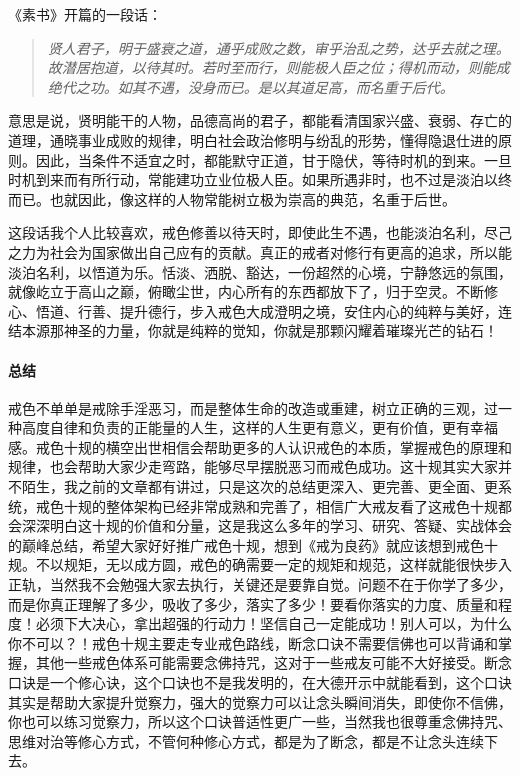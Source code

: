 《素书》开篇的一段话：

\begin{quote}\it
    贤人君子，明于盛衰之道，通乎成败之数，审乎治乱之势，达乎去就之理。故潜居抱道，以待其时。若时至而行，则能极人臣之位；得机而动，则能成绝代之功。如其不遇，没身而已。是以其道足高，而名重于后代。
\end{quote}

意思是说，贤明能干的人物，品德高尚的君子，都能看清国家兴盛、衰弱、存亡的道理，通晓事业成败的规律，明白社会政治修明与纷乱的形势，懂得隐退仕进的原则。因此，当条件不适宜之时，都能默守正道，甘于隐伏，等待时机的到来。一旦时机到来而有所行动，常能建功立业位极人臣。如果所遇非时，也不过是淡泊以终而已。也就因此，像这样的人物常能树立极为崇高的典范，名重于后世。

这段话我个人比较喜欢，戒色修善以待天时，即使此生不遇，也能淡泊名利，尽己之力为社会为国家做出自己应有的贡献。真正的戒者对修行有更高的追求，所以能淡泊名利，以悟道为乐。恬淡、洒脱、豁达，一份超然的心境，宁静悠远的氛围，就像屹立于高山之巅，俯瞰尘世，内心所有的东西都放下了，归于空灵。不断修心、悟道、行善、提升德行，步入戒色大成澄明之境，安住内心的纯粹与美好，连结本源那神圣的力量，你就是纯粹的觉知，你就是那颗闪耀着璀璨光芒的钻石！

\paragraph*{总结}

戒色不单单是戒除手淫恶习，而是整体生命的改造或重建，树立正确的三观，过一种高度自律和负责的正能量的人生，这样的人生更有意义，更有价值，更有幸福感。戒色十规的横空出世相信会帮助更多的人认识戒色的本质，掌握戒色的原理和规律，也会帮助大家少走弯路，能够尽早摆脱恶习而戒色成功。这十规其实大家并不陌生，我之前的文章都有讲过，只是这次的总结更深入、更完善、更全面、更系统，戒色十规的整体架构已经非常成熟和完善了，相信广大戒友看了这戒色十规都会深深明白这十规的价值和分量，这是我这么多年的学习、研究、答疑、实战体会的巅峰总结，希望大家好好推广戒色十规，想到《戒为良药》就应该想到戒色十规。不以规矩，无以成方圆，戒色的确需要一定的规矩和规范，这样就能很快步入正轨，当然我不会勉强大家去执行，关键还是要靠自觉。问题不在于你学了多少，而是你真正理解了多少，吸收了多少，落实了多少！要看你落实的力度、质量和程度！必须下大决心，拿出超强的行动力！坚信自己一定能成功！别人可以，为什么你不可以？！戒色十规主要走专业戒色路线，断念口诀不需要信佛也可以背诵和掌握，其他一些戒色体系可能需要念佛持咒，这对于一些戒友可能不大好接受。断念口诀是一个修心诀，这个口诀也不是我发明的，在大德开示中就能看到，这个口诀其实是帮助大家提升觉察力，强大的觉察力可以让念头瞬间消失，即使你不信佛，你也可以练习觉察力，所以这个口诀普适性更广一些，当然我也很尊重念佛持咒、思维对治等修心方式，不管何种修心方式，都是为了断念，都是不让念头连续下去。

